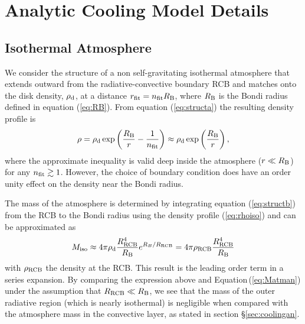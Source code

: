 \documentclass[apj, numberedappendix]{emulateapj}
\newcommand{\Eq}[1]{Equation\,(\ref{#1})}
\newcommand{\RB}{R_{\rm B}}
\newcommand{\co}{_{\rm c}}
\newcommand{\di}{_{\rm d}}
\newcommand{\cb}{_{\rm RCB}}
\begin{document}
\section{Analytic Cooling Model Details}\label{sec:analytic}

\subsection{Isothermal Atmosphere}
\label{iso}

We consider the structure of a non self-gravitating isothermal atmosphere that extends outward from the radiative-convective boundary RCB and matches onto the disk density, $\rho_{\rm d}$, at a distance $r_{\rm fit} = n_{\rm fit} \RB$, where $R_{\rm B}$ is the Bondi radius defined in equation (\ref{eq:RB}). From equation (\ref{eq:structa}) the resulting density profile is
\begin{equation} \label{eq:rhoiso}
\rho = \rho_{\rm d} \exp \left({R_{\rm B} \over r} - {1 \over n_{\rm{fit}}} \right) \approx   \rho_{\rm{d}} \exp \left(R_{\rm B} \over r  \right),
\end{equation} 
where the approximate inequality is valid deep inside the atmosphere ($r \ll \RB$) for any $n_{\rm fit} \gtrsim 1$.  However, the choice of boundary condition does have an order unity effect on the density near the Bondi radius. 

The mass of the atmosphere is determined by integrating equation (\ref{eq:structb}) from the RCB to the Bondi radius using the density profile (\ref{eq:rhoiso}) and can be approximated as
\begin{equation} \label{eq:MatmISO}
M_{\rm iso} \approx 4 \pi \rho\di {R\cb^4 \over R_{\rm B}} e^{R_B/R\cb} = 4\pi \rho\cb \frac{R\cb^4}{R_{\rm B}}
\end{equation}
with $\rho\cb$ the density at the RCB.
This result is the leading order term in a series expansion. By comparing the expression above and \Eq{eq:Matman} under the assumption that $R\cb \ll R_{\rm B}$, we see that the mass of the outer radiative region (which is nearly isothermal) is negligible when compared with the atmosphere mass in the convective layer, as stated in section \S\ref{sec:coolingan}.
\end{document}
